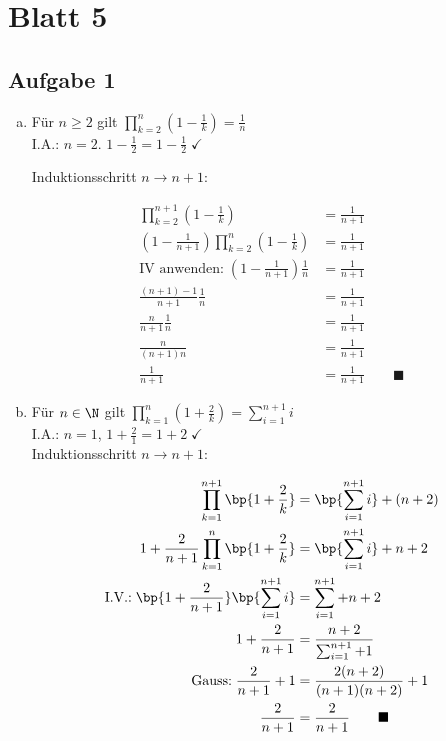 \section*{Blatt 5}

\subsection*{Aufgabe 1}

\begin{enumerate}[a)]

\item Für $n\geq 2$ gilt $\prod_{k=2}^n (1 - \frac{1}{k}) = \frac{1}{n}$ \\

I.A.: $n=2$. $1 - \frac{1}{2} = 1 - \frac{1}{2} \; \checkmark$

Induktionsschritt $n \to n+1$:

\begin{align*}
\prod_{k=2}^{n+1} (1 - \frac{1}{k}) &= \frac{1}{n+1} \\
(1 - \frac{1}{n+1}) \prod_{k=2}^{n} (1 - \frac{1}{k}) &= \frac{1}{n+1} \\
\text{IV anwenden:} \; (1- \frac{1}{n+1})\frac{1}{n} &= \frac{1}{n+1} \\
\frac{(n+1)-1}{n+1} \frac{1}{n} &= \frac{1}{n+1}\\
\frac{n}{n+1} \frac{1}{n} &= \frac{1}{n+1}\\
\frac{n}{(n+1)n} &= \frac{1}{n+1}\\
\frac{1}{n+1} &= \frac{1}{n+1} \hspace{2em} \blacksquare
\end{align*}

\item Für $n\in\N$ gilt $\prod_{k=1}^{n} (1 + \frac{2}{k}) = \sum_{i=1}^{n+1} i$\\

I.A.: $n=1$, $ 1 + \frac{2}{1} = 1+2 \; \checkmark$ \\
Induktionsschritt $n \to n+1$:

\begin{align*}
\prod_{k=1}^{n+1} \bp{1 + \frac{2}{k}} &= \bp{\sum_{i=1}^{n+1} i} + (n+2) \\
1 + \frac{2}{n+1} \prod_{k=1}^{n} \bp{1 + \frac{2}{k}} &= \bp{\sum_{i=1}^{n+1} i} + n + 2 \\
\text{I.V.:} \; \bp{ 1 + \frac{2}{n+1} } \bp{ \sum_{i=1}^{n+1} i } &= \sum_{i=1}^{n+1} + n + 2\\
1 + \frac{2}{n+1} &= \frac{n+2}{ \sum_{i=1}^{n+1} +1}\\
\text{Gauss:} \; \frac{2}{n+1} + 1 &= \frac{2(n+2)}{(n+1)(n+2)}+1\\
\frac{2}{n+1} &= \frac{2}{n+1} \hspace{2em} \blacksquare
\end{align*}
\end{enumerate}

